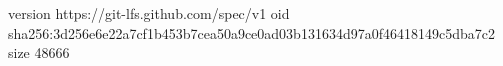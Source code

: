 version https://git-lfs.github.com/spec/v1
oid sha256:3d256e6e22a7cf1b453b7cea50a9ce0ad03b131634d97a0f46418149c5dba7c2
size 48666
